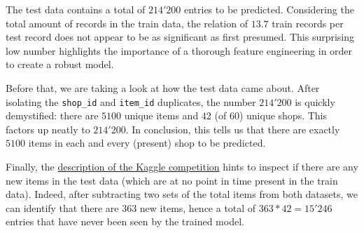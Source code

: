 The test data contains a total of $214'200$ entries to be predicted. Considering the total amount of records in the train data, the relation of $13.7$ train records per test record does not appear to be as significant as first presumed. This surprising low number highlights the importance of a thorough feature engineering in order to create a robust model.

Before that, we are taking a look at how the test data came about. After isolating the \texttt{shop\_id} and \texttt{item\_id} duplicates, the number $214'200$ is quickly demystified: there are $5100$ unique items and $42$ (of $60$) unique shops. 
This factors up neatly to $214'200$.
In conclusion, this tells us that there are exactly $5100$ items in each and every (present) shop to be predicted.

Finally, the \href{https://www.kaggle.com/c/competitive-data-science-predict-future-sales/data}{description of the Kaggle competition} hints to inspect if there are any new items in the test data (which are at no point in time present in the train data). 
Indeed, after subtracting two sets of the total items from both datasets, we can identify that there are $363$ new items, hence a total of $363*42=15'246$ entries that have never been seen by the trained model.
